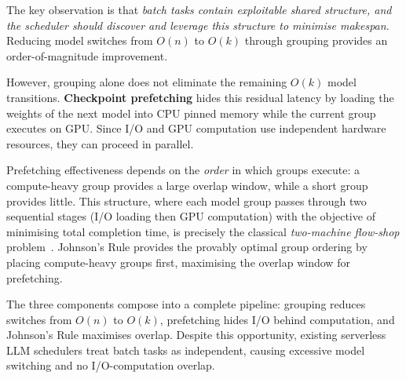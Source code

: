 \documentclass[logo,bsc,singlespacing,parskip,online]{infthesis}
\begin{document}
The key observation is that \textit{batch tasks contain exploitable shared structure, and the scheduler should discover and leverage this structure to minimise makespan}. Reducing model switches from $O(n)$ to $O(k)$ through grouping provides an order-of-magnitude improvement.

However, grouping alone does not eliminate the remaining $O(k)$ model transitions. \textbf{Checkpoint prefetching} hides this residual latency by loading the weights of the next model into CPU pinned memory while the current group executes on GPU. Since I/O and GPU computation use independent hardware resources, they can proceed in parallel.

Prefetching effectiveness depends on the \textit{order} in which groups execute: a compute-heavy group provides a large overlap window, while a short group provides little. This structure, where each model group passes through two sequential stages (I/O loading then GPU computation) with the objective of minimising total completion time, is precisely the classical \textit{two-machine flow-shop} problem~\cite{johnson1954optimal}. Johnson's Rule provides the provably optimal group ordering by placing compute-heavy groups first, maximising the overlap window for prefetching.

The three components compose into a complete pipeline: grouping reduces switches from $O(n)$ to $O(k)$, prefetching hides I/O behind computation, and Johnson's Rule maximises overlap. Despite this opportunity, existing serverless LLM schedulers treat batch tasks as independent, causing excessive model switching and no I/O-computation overlap.
\end{document}

